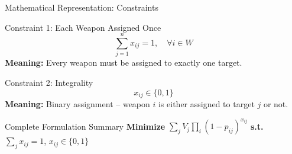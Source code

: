 \documentclass[aspectratio=43,8pt]{beamer}
\begin{document}
\begin{frame}{Mathematical Representation: Constraints}
\begin{block}{Constraint 1: Each Weapon Assigned Once}
\begin{equation*}
\sum_{j=1}^{n} x_{ij} = 1, \quad \forall i \in W
\end{equation*}
\textbf{Meaning:} Every weapon must be assigned to exactly one target.
\end{block}

\vspace{0.3cm}
\begin{alertblock}{Constraint 2: Integrality}
\begin{equation*}
x_{ij} \in \{0, 1\}
\end{equation*}
\textbf{Meaning:} Binary assignment -- weapon $i$ is either assigned to target $j$ or not.
\end{alertblock}

\vspace{0.3cm}
\begin{exampleblock}{Complete Formulation Summary}
\textbf{Minimize} $\sum_{j} V_j \prod_{i} (1-p_{ij})^{x_{ij}}$ \quad
\textbf{s.t.} $\sum_{j} x_{ij} = 1$, \quad $x_{ij} \in \{0,1\}$
\end{exampleblock}
\end{frame}
\end{document}
